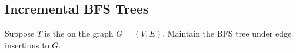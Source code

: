 \subsection{Incremental BFS Trees}
\begin{problem}
    Suppose $T$ is the  on the graph $G = (V, E)$. Maintain the BFS tree under edge insertions to $G$.
\end{problem}



